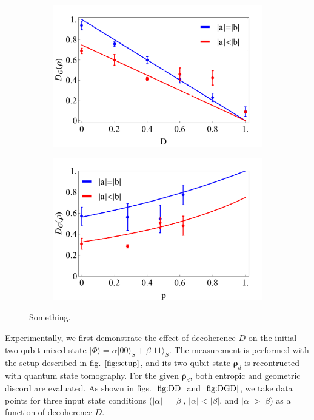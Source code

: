 \documentclass[%
 reprint,
 amsmath,amssymb,
 aps,
]{revtex4-1}
\begin{document}
\begin{figure}
        \centering
        \begin{subfigure}[b]{0.49\textwidth}
                \includegraphics[width=\textwidth]{DGD}
                \caption{}
                \label{fig:DGD}
        \end{subfigure}
        \vfill
        \begin{subfigure}[b]{0.49\textwidth}
                \includegraphics[width=\textwidth]{DGp}
                \caption{}
                \label{fig:DGp}
        \end{subfigure}
        \caption{Something.}\label{fig:DG}
\end{figure}

\noindent Experimentally, we first demonstrate the effect of decoherence $D$ on the initial two qubit mixed state $|\Phi\rangle = \alpha |00\rangle_S + \beta |11\rangle_S$. The measurement is performed with the setup described in fig. $\ref{fig:setup}$, and its two-qubit state $\boldsymbol{\rho}_d$ is recontructed with quantum state tomography. For the given $\boldsymbol{\rho}_d$, both entropic and geometric discord are evaluated. As shown in figs. $\ref{fig:DD}$ and $\ref{fig:DGD}$, we take data points for three input state conditions ($|\alpha|=|\beta|$, $|\alpha|<|\beta|$, and $|\alpha|>|\beta$) as a function of decoherence $D$.
\end{document}
